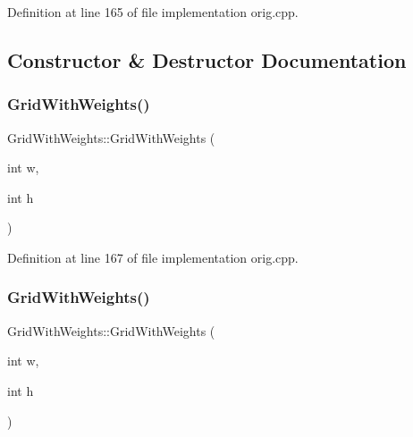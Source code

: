 Definition at line 165 of file implementation orig.\+cpp.



\subsection{Constructor \& Destructor Documentation}
\mbox{\label{struct_grid_with_weights_ad9eb67bf93deb3409ecf658288bc78f6}} 
\subsubsection{\texorpdfstring{Grid\+With\+Weights()}{GridWithWeights()}\hspace{0.1cm}{\footnotesize\ttfamily [1/2]}}
{\footnotesize\ttfamily Grid\+With\+Weights\+::\+Grid\+With\+Weights (\begin{DoxyParamCaption}\item[{int}]{w,  }\item[{int}]{h }\end{DoxyParamCaption})\hspace{0.3cm}{\ttfamily [inline]}}



Definition at line 167 of file implementation orig.\+cpp.

\mbox{\label{struct_grid_with_weights_ad9eb67bf93deb3409ecf658288bc78f6}} 
\subsubsection{\texorpdfstring{Grid\+With\+Weights()}{GridWithWeights()}\hspace{0.1cm}{\footnotesize\ttfamily [2/2]}}
{\footnotesize\ttfamily Grid\+With\+Weights\+::\+Grid\+With\+Weights (\begin{DoxyParamCaption}\item[{int}]{w,  }\item[{int}]{h }\end{DoxyParamCaption})\hspace{0.3cm}{\ttfamily [inline]}}




